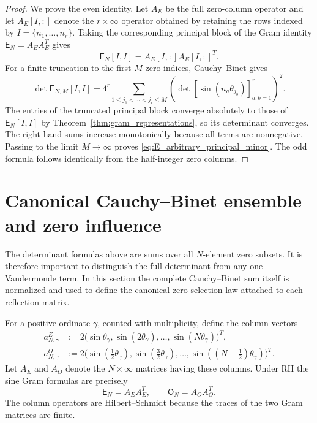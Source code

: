 \documentclass[preprint,12pt]{elsarticle}
\numberwithin{equation}{section}
\theoremstyle{plain}
\theoremstyle{definition}
\theoremstyle{remark}
\newcommand{\RH}{\mathrm{RH}}
\newcommand{\E}{\mathsf E}
\newcommand{\Omat}{\mathsf O}
\begin{document}
\begin{proof}
We prove the even identity.  Let $A_E$ be the full zero-column operator and let $A_E[I,:]$ denote the $r\times\infty$ operator obtained by retaining the rows indexed by $I=\{n_1,\ldots,n_r\}$.  Taking the corresponding principal block of the Gram identity $\E_N=A_EA_E^T$ gives
\begin{equation}
\E_N[I,I]=A_E[I,:]A_E[I,:]^T.
\end{equation}
For a finite truncation to the first $M$ zero indices, Cauchy--Binet gives
\begin{equation}
\det\E_{N,M}[I,I]
=4^r\sum_{1\le j_1<\cdots<j_r\le M}
\left(\det[\sin(n_a\theta_{j_b})]_{a,b=1}^r\right)^2.
\end{equation}
The entries of the truncated principal block converge absolutely to those of $\E_N[I,I]$ by Theorem~\ref{thm:gram_representations}, so its determinant converges.  The right-hand sums increase monotonically because all terms are nonnegative.  Passing to the limit $M\to\infty$ proves \eqref{eq:E_arbitrary_principal_minor}.  The odd formula follows identically from the half-integer zero columns.
\end{proof}

\section{Canonical Cauchy--Binet ensemble and zero influence}
\label{sec:zero_leverage}

The determinant formulas above are sums over all $N$-element zero subsets.  It is therefore important to distinguish the full determinant from any one Vandermonde term.  In this section the complete Cauchy--Binet sum itself is normalized and used to define the canonical zero-selection law attached to each reflection matrix.

For a positive ordinate $\gamma$, counted with multiplicity, define the column vectors
\begin{align}
a_{N,\gamma}^{E}
&:=2\bigl(\sin\theta_\gamma,\sin(2\theta_\gamma),\ldots,\sin(N\theta_\gamma)\bigr)^T,
\label{eq:E_zero_column}\\
a_{N,\gamma}^{O}
&:=2\bigl(\sin(\tfrac12\theta_\gamma),\sin(\tfrac32\theta_\gamma),\ldots,
\sin((N-\tfrac12)\theta_\gamma)\bigr)^T.
\label{eq:O_zero_column}
\end{align}
Let $A_E$ and $A_O$ denote the $N\times\infty$ matrices having these columns.  Under $\RH$ the sine Gram formulas are precisely
\begin{equation}
\E_N=A_EA_E^T,
\qquad
\Omat_N=A_OA_O^T.
\label{eq:zero_column_gram}
\end{equation}
The column operators are Hilbert--Schmidt because the traces of the two Gram matrices are finite.
\end{document}
